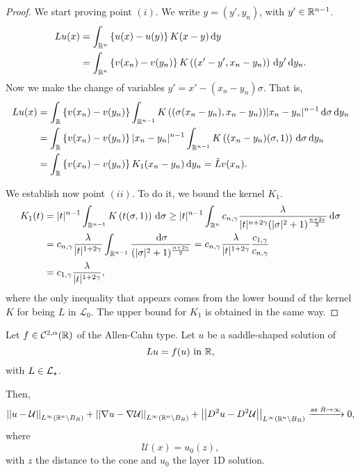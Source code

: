 \begin{proof}
	
	We start proving point $(i)$. We write $y=(y',y_n)$, with $y'\in \mathbb{R}^{n-1}$.
	\begin{align*}
	Lu(x) &= \int_{\mathbb{R}^n} \left\{ u(x)-u(y) \right\} K(x-y) \,\mathrm{d} y \\
	&=\int_{\mathbb{R}^n} \left\{ v(x_n)-v(y_n) \right\} K\left((x'-y',x_n-y_n)\right) \,\mathrm{d} y' \,\mathrm{d} y_n.
	\end{align*}
	Now we make the change of variables $y' = x'-(x_n-y_n)\sigma$. That is,
	\begin{align*}
	Lu(x) &= \int_{\mathbb{R}} \left\{ v(x_n)-v(y_n) \right\} \int_{\mathbb{R}^{n-1}} K\left((\sigma(x_n-y_n),x_n-y_n\right)) |x_n-y_n|^{n-1} \,\mathrm{d} \sigma \,\mathrm{d} y_n \\
	&= \int_{\mathbb{R}} \left\{ v(x_n)-v(y_n) \right\} |x_n-y_n|^{n-1} \int_{\mathbb{R}^{n-1}} K\left((x_n-y_n)(\sigma,1)\right) \,\mathrm{d}\sigma \,\mathrm{d} y_n \\
	&= \int_{\mathbb{R}} \left\{ v(x_n)-v(y_n) \right\} K_1(x_n-y_n ) \,\mathrm{d} y_n = \tilde{L}v(x_n). \\
	\end{align*}
	
	We establish now point $(ii)$. To do it, we bound the kernel $K_1$. 
	\begin{align*}
	K_1(t) &= |t|^{n-1} \int_{\mathbb{R}^{n-1}} K\left(t(\sigma,1)\right) \,\mathrm{d}\sigma \geq |t|^{n-1} \int_{\mathbb{R}^n} c_{n,\gamma} \frac{\lambda}{|t|^{n+2\gamma}(|\sigma|^2+1)^{\frac{n+2s}{2}}} \,\mathrm{d}\sigma \\
	&= c_{n,\gamma} \frac{\lambda}{|t|^{1+2\gamma}} \int_{\mathbb{R}^{n-1}} \frac{\,\mathrm{d}\sigma}{(|\sigma|^2+1)^{\frac{n+2\gamma}{2}}} = c_{n,\gamma} \frac{\lambda}{|t|^{1+2\gamma}} \frac{c_{1,\gamma}}{c_{n,\gamma}} \\
	&= c_{1,\gamma} \frac{\lambda}{|t|^{1+2\gamma}},
	\end{align*}
	where the only inequality that appears comes from the lower bound of the kernel $K$ for being $L$ in $\mathcal{L}_0$. The upper bound for $K_1$ is obtained in the same way.
\end{proof}







\begin{theorem}
\label{Thm:AsymptoticBehaviourSaddleSolution}
Let $f\in \mathcal{C}^{2,\alpha}(\mathbb{R})$ of the Allen-Cahn type. Let $u$ be a saddle-shaped solution of
$$
Lu = f(u) \ \textrm{in } \R,
$$
with $L\in \mathcal{L}_\star$.

Then,
$$
\left | \left |{u-\mathcal{U}} \right | \right |_{L^\infty(\mathbb{R}^n\setminus B_R)}+\left | \left |{\nabla u-\nabla \mathcal{U}} \right | \right |_{L^\infty(\mathbb{R}^n\setminus B_R)}+\left | \left |{D^2u-D^2\mathcal{U}} \right | \right |_{L^\infty(\mathbb{R}^n\setminus B_R)} \xrightarrow{\text{as } R\to \infty}{} 0,
$$
where
$$
\mathcal{U}(x) = u_0(z),
$$
with $z$ the distance to the cone and $u_0$ the layer 1D solution.
\end{theorem}

